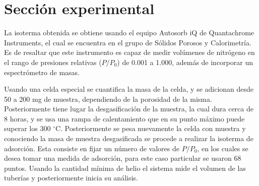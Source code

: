 \documentclass[fleqn,11pt]{SelfArx}
\begin{document}
	\section{Secci\'on experimental}
	La isoterma obtenida se obtiene usando el equipo Autosorb iQ de Quantachrome Instruments, el cual se encuentra en el grupo de Sólidos Porosos y Calorimetría. Es de resaltar que este instrumento es capaz de medir vol\'umenes de nitr\'ogeno en el rango de presiones relativas ($P/P_0$) de 0.001 a 1.000, adem\'as de incorporar un espectr\'ometro de masas.
	
	Usando una celda especial se cuantifica la masa de la celda, y se adicionan desde 50 a 200 mg de muestra, dependiendo de la porosidad de la misma. Posteriormente tiene lugar la desgasificaci\'on de la muestra, la cual dura cerca de 8 horas, y se usa una rampa de calentamiento que en su punto m\'aximo puede superar los 300 $^\circ$C. Posteriormente se pesa nuevamente la celda con muestra y conociendo la masa de muestra desgasificada se procede a realizar la isoterma de adsorci\'on. Esta consiste en fijar un n\'umero de valores de $P/P_0$, en los cuales se desea tomar una medida de adsorci\'on, para este caso particular se usaron 68 puntos. Usando la cantidad m\'inima de helio el sistema mide el volumen de las tuber\'ias y posteriormente inicia su an\'alisis.	
	
\end{document}
